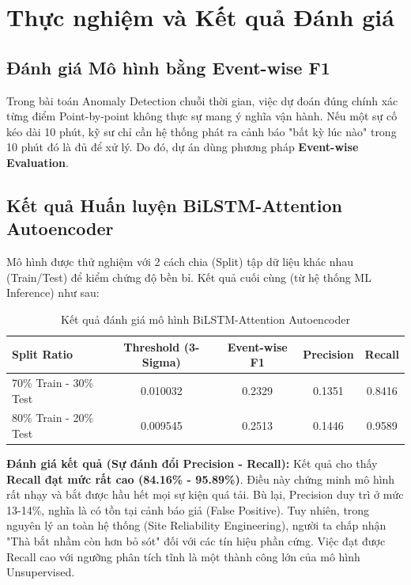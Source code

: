 \documentclass[12pt,a4paper]{article}
\begin{document}
\section{Thực nghiệm và Kết quả Đánh giá}

\subsection{Đánh giá Mô hình bằng Event-wise F1}
Trong bài toán Anomaly Detection chuỗi thời gian, việc dự đoán đúng chính xác từng điểm Point-by-point không thực sự mang ý nghĩa vận hành. Nếu một sự cố kéo dài 10 phút, kỹ sư chỉ cần hệ thống phát ra cảnh báo "bất kỳ lúc nào" trong 10 phút đó là đủ để xử lý. Do đó, dự án dùng phương pháp \textbf{Event-wise Evaluation}.

\subsection{Kết quả Huấn luyện BiLSTM-Attention Autoencoder}
Mô hình được thử nghiệm với 2 cách chia (Split) tập dữ liệu khác nhau (Train/Test) để kiểm chứng độ bền bỉ. Kết quả cuối cùng (từ hệ thống ML Inference) như sau:

\begin{table}[H]
    \centering
    \begin{tabular}{|l|c|c|c|c|}
        \hline
        \textbf{Split Ratio} & \textbf{Threshold (3-Sigma)} & \textbf{Event-wise F1} & \textbf{Precision} & \textbf{Recall} \\
        \hline
        70\% Train - 30\% Test & 0.010032 & 0.2329 & 0.1351 & 0.8416 \\
        80\% Train - 20\% Test & 0.009545 & 0.2513 & 0.1446 & 0.9589 \\
        \hline
    \end{tabular}
    \caption{Kết quả đánh giá mô hình BiLSTM-Attention Autoencoder}
    \label{tab:results}
\end{table}

\textbf{Đánh giá kết quả (Sự đánh đổi Precision - Recall):}
Kết quả cho thấy \textbf{Recall đạt mức rất cao (84.16\% - 95.89\%)}. Điều này chứng minh mô hình rất nhạy và bắt được hầu hết mọi sự kiện quá tải. Bù lại, Precision duy trì ở mức 13-14\%, nghĩa là có tồn tại cảnh báo giả (False Positive). 
Tuy nhiên, trong nguyên lý an toàn hệ thống (Site Reliability Engineering), người ta chấp nhận "Thà bắt nhầm còn hơn bỏ sót" đối với các tín hiệu phần cứng. Việc đạt được Recall cao với ngưỡng phân tích tĩnh là một thành công lớn của mô hình Unsupervised.
\end{document}
